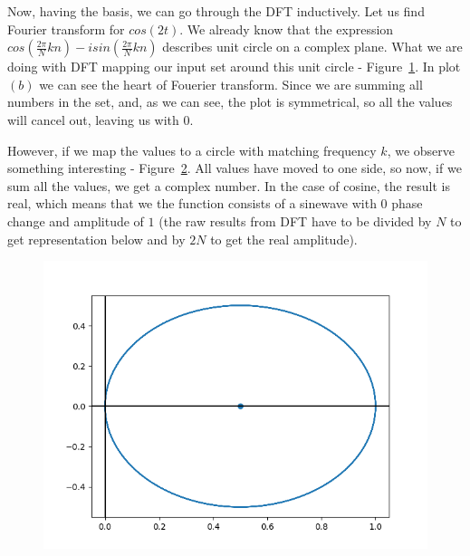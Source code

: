 \documentclass{article}
\begin{document}
    Now, having the basis, we can go through the DFT inductively. Let us find 
    Fourier transform for $cos(2t)$. We already know that the expression 
    $cos\left(\frac{2\pi}{N}kn\right) - isin\left(\frac{2\pi}{N}kn\right)$ describes
    unit circle on a complex plane. What we are doing with DFT mapping our input
    set around this unit circle - Figure~\ref{fig:cos_wrapped}. In plot $(b)$ we
    can see the heart of Fouerier transform. Since we are summing all numbers in 
    the set, and, as we can see, the plot is symmetrical, so all the values will 
    cancel out, leaving us with 0.
    \begin{figure}[H]
      \caption{}\label{fig:cos_wrapped}
      \centering
      \hfill
    \end{figure}
    However, if we map the values to a circle with matching frequency $k$, we 
    observe something interesting - Figure~\ref{fig:cos_wrapped_2k}. All values
    have moved to one side, so now, if we sum all the values, we get a complex
    number. In the case of cosine, the result is real, which means that we 
    the function consists of a sinewave with $0$ phase change and amplitude of
    $1$ (the raw results from DFT have to be divided by $N$ to get representation
    below and by $2N$ to get the real amplitude).
    \begin{figure}[H]
        \caption{}
        \centering
        \includegraphics[width=0.4\linewidth]{cos_wrapped_2k}
        \label{fig:cos_wrapped_2k}
    \end{figure}
\end{document}
